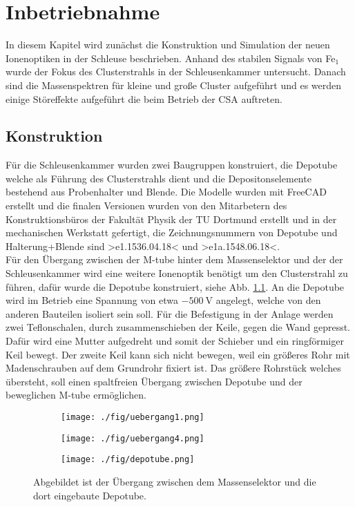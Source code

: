 \chapter{Inbetriebnahme}
In diesem Kapitel wird zunächst die Konstruktion und Simulation der neuen Ionenoptiken in der Schleuse beschrieben.
Anhand des stabilen Signals von Fe$_1$ wurde der Fokus des Clusterstrahls in der Schleusenkammer untersucht.
Danach sind die Massenspektren für kleine und große Cluster aufgeführt und es werden einige Störeffekte aufgeführt die beim Betrieb der CSA auftreten.
\section{Konstruktion}
Für die Schleusenkammer wurden zwei Baugruppen konstruiert, die Depotube welche als Führung des Clusterstrahls dient und die Depositonselemente bestehend aus Probenhalter und Blende. Die Modelle wurden mit FreeCAD\cite{freecad} erstellt und die finalen Versionen wurden von den Mitarbetern des Konstruktionsbüros der Fakultät Physik der TU Dortmund erstellt \cite{konstruktion} und in der mechanischen Werkstatt gefertigt, die Zeichnungsnummern von Depotube und Halterung+Blende sind >e1.1536.04.18< und >e1a.1548.06.18<.\\

Für den Übergang zwischen der M-tube hinter dem Massenselektor und der der Schleusenkammer wird eine weitere Ionenoptik benötigt um den Clusterstrahl zu führen, dafür wurde die Depotube konstruiert, siehe Abb. \ref{fig:depotube}.
An die Depotube wird im Betrieb eine Spannung von etwa $\SI{-500}{\volt}$ angelegt, welche von den anderen Bauteilen isoliert sein soll.
Für die Befestigung in der Anlage werden zwei Teflonschalen, durch zusammenschieben der Keile, gegen die Wand gepresst.
Dafür wird eine Mutter aufgedreht und somit der Schieber und ein ringförmiger Keil bewegt.
Der zweite Keil kann sich nicht bewegen, weil ein größeres Rohr mit Madenschrauben auf dem Grundrohr fixiert ist.
Das größere Rohrstück welches übersteht, soll einen spaltfreien Übergang zwischen Depotube und der beweglichen M-tube ermöglichen.

\begin{figure}
  \begin{subfigure}[h]{1\textwidth}
    \texttt{[image: ./fig/uebergang1.png]}
  \end{subfigure}\hfill
  \begin{subfigure}[h]{1\textwidth}
    \texttt{[image: ./fig/uebergang4.png]}
  \end{subfigure}\hfill
  \begin{subfigure}[h]{1\textwidth}
    \texttt{[image: ./fig/depotube.png]}
  \end{subfigure}
  \caption{Abgebildet ist der Übergang zwischen dem Massenselektor und die dort eingebaute Depotube.}
  \label{fig:depotube}
\end{figure}

